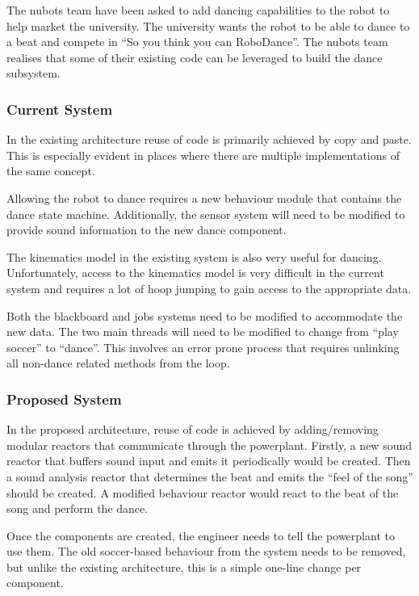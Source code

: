 \documentclass[english,12pt]{scrartcl}
\begin{document}
			The \gls{nubots} team have been asked to add dancing capabilities to the robot to help market the university.
			The university wants the robot to be able to dance to a beat and compete in ``So you think you can RoboDance''.
			The \gls{nubots} team realises that some of their existing code can be leveraged to build the dance subsystem.

			\subsubsection{Current System}
				In the existing architecture reuse of code is primarily achieved by copy and paste.
				This is especially evident in places where there are multiple implementations of the same concept.
				
				Allowing the robot to dance requires a new behaviour module that contains the dance state machine.
				Additionally, the sensor system will need to be modified to provide sound information to the new dance component. 
				
				The kinematics model in the existing system is also very useful for dancing.
				Unfortunately, access to the kinematics model is very difficult in the current system and requires a lot of hoop jumping to gain access to the appropriate data. 

				Both the blackboard and jobs systems need to be modified to accommodate the new data.
				The two main threads will need to be modified to change from ``play soccer'' to ``dance''.
				This involves an error prone process that requires unlinking all non-dance related methods from the loop.
				
			\subsubsection{Proposed System}
				In the proposed architecture, reuse of code is achieved by adding/removing modular \glspl{reactor} that communicate through the \gls{powerplant}.
				Firstly, a new sound \gls{reactor} that buffers sound input and emits it periodically would be created.
				Then a sound analysis \gls{reactor} that determines the beat and emits the ``feel of the song'' should be created.
				A modified behaviour \gls{reactor} would react to the beat of the song and perform the dance.
				
				Once the components are created, the engineer needs to tell the \gls{powerplant} to use them.
				The old soccer-based behaviour from the system needs to be removed, but unlike the existing architecture, this is a simple one-line change per component.
\end{document}
